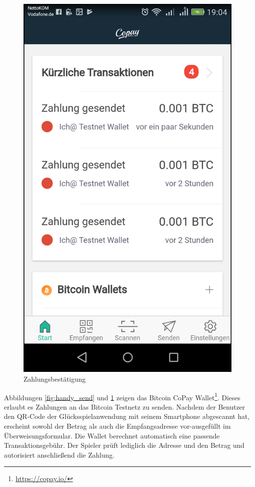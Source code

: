 \begin{minipage}{0.48\textwidth}
\begin{figure}[H]
\centering
\includegraphics[width=1\linewidth]{Figures/btc_gui/handy_confirm}
\decoRule
\caption{Zahlungsbestätigung}
\label{fig:handy_confirm}
\end{figure}
\end{minipage}

Abbildungen \ref{fig:handy_send} und \ref{fig:handy_confirm} zeigen das Bitcoin CoPay Wallet\footnote{\url{https://copay.io/}}. Dieses erlaubt es Zahlungen an das Bitcoin Testnetz zu senden. Nachdem der Benutzer den QR-Code der Glücksspielanwendung mit seinem Smartphone abgescannt hat, erscheint sowohl der Betrag als auch die Empfangsadresse vor-ausgefüllt im Überweisungsformular. Die Wallet berechnet automatisch eine passende Transaktionsgebühr. Der Spieler prüft lediglich die Adresse und den Betrag und  autorisiert anschließend die Zahlung.

